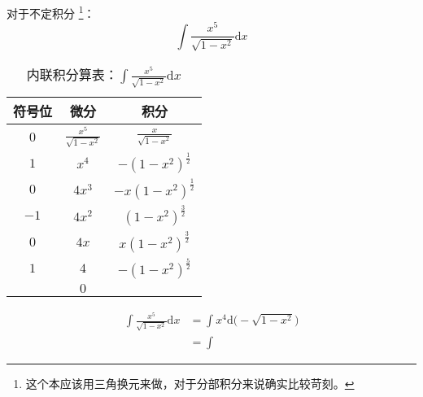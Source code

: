 对于不定积分 \footnote{这个本应该用三角换元来做，对于分部积分来说确实比较苛刻。}：
\begin{equation*}
    \int {\frac{x^5}{\sqrt{1 - x^2}} \mathrm{d} x} 
\end{equation*}

\begin{table}[H]
    \centering
    \begin{tabular}{c c c}
        符号位 & 微分 & 积分 \\
        \hline
        $0$  & $\frac{x^5}{\sqrt{1 - x^2}}$  & $\frac{x}{\sqrt{1 - x^2}}$ \\
        $1$  & $x^4$ & $-(1 - x^2)^{\frac{1}{2}}$ \\
        $0$  & $4x^3$ & $- x (1 - x^2)^{\frac{1}{2}}$ \\
        $-1$ & $4x^2$ & $(1 - x^2)^{\frac{3}{2}}$      \\
        $0$  & $4x$ & $x(1 - x^2)^{\frac{3}{2}}$ \\
        $1$  & $4$ & $-(1 - x^2)^{\frac{5}{2}}$ \\
             & $0$ & \\
    \end{tabular}
    \caption{内联积分算表：$\int {\frac{x^5}{\sqrt{1 - x^2}} \mathrm{d} x}$}
    \label{tab:2}
\end{table}


\begin{equation}
\begin{aligned}
    \int {\frac{x^5}{\sqrt{1 - x^2}} \mathrm{d}x} 
    & = \int {x^4\mathrm{d}\Big(- \sqrt{1- x^2}\Big) } \\
    & = \int 
\end{aligned}
\end{equation}
